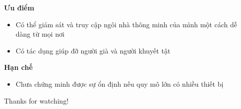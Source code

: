 \documentclass[11pt]{beamer}
\begin{document}

\begin{frame}[c]{}

	\textbf{Ưu điểm}

	\vspace{1em}

	\begin{itemize}

		\setlength\itemsep{1em}

		\item{Có thể giám sát và truy cập ngôi nhà thông minh của mình một cách dễ dàng từ mọi nơi}
		
		\item{Có tác dụng giúp đỡ người già và người khuyết tật}

	\end{itemize}

	\vspace{1em}

	\textbf{Hạn chế}

	\vspace{1em}

	\begin{itemize}

		\setlength\itemsep{1em}

		\item{Chưa chứng minh được sự ổn định nếu quy mô lớn có nhiều thiết bị}
		
	\end{itemize}

\end{frame}


\begin{frame}[standout]
	\flushleft
	\Huge
	Thanks for watching!
\end{frame}

	
\end{document}
